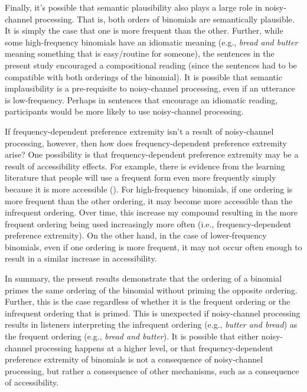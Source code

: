 \documentclass[
  12pt,
]{scrartcl}
\begin{document}
Finally, it's possible that semantic plausibility also plays a large
role in noisy-channel processing. That is, both orders of binomials are
semantically plausible. It is simply the case that one is more frequent
than the other. Further, while some high-frequency binomials have an
idiomatic meaning (e.g., \emph{bread and butter} meaning something that
is easy/routine for someone), the sentences in the present study
encouraged a compositional reading (since the sentences had to be
compatible with both orderings of the binomial). It is possible that
semantic implausibility is a pre-requisite to noisy-channel processing,
even if an utterance is low-frequency. Perhaps in sentences that
encourage an idiomatic reading, participants would be more likely to use
noisy-channel processing.

If frequency-dependent preference extremity isn't a result of
noisy-channel processing, however, then how does frequency-dependent
preference extremity arise? One possibility is that frequency-dependent
preference extremity may be a result of accessibility effects. For
example, there is evidence from the learning literature that people will
use a frequent form even more frequently simply because it is more
accessible (). For high-frequency binomials, if one ordering is
more frequent than the other ordering, it may become more accessible
than the infrequent ordering. Over time, this increase my compound
resulting in the more frequent ordering being used increasingly more
often (i.e., frequency-dependent preference extremity). On the other
hand, in the case of lower-frequency binomials, even if one ordering is
more frequent, it may not occur often enough to result in a similar
increase in accessibility.

In summary, the present results demonstrate that the ordering of a
binomial primes the same ordering of the binomial without priming the
opposite ordering. Further, this is the case regardless of whether it is
the frequent ordering or the infrequent ordering that is primed. This is
unexpected if noisy-channel processing results in listeners interpreting
the infrequent ordering (e.g., \emph{butter and bread}) as the frequent
ordering (e.g., \emph{bread and butter}). It is possible that either
noisy-channel processing happens at a higher level, or that
frequency-dependent preference extremity of binomials is not a
consequence of noisy-channel processing, but rather a consequence of
other mechanisms, such as a consequence of accessibility.
\end{document}
